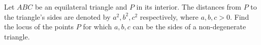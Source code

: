 Let $ ABC$ be an equilateral triangle and $ P$ in its interior. The distances from $ P$ to the triangle's sides are denoted by $ a^2, b^2,c^2$ respectively, where $ a,b,c>0$. Find the locus of the points $ P$ for which $ a,b,c$ can be the sides of a non-degenerate triangle.
